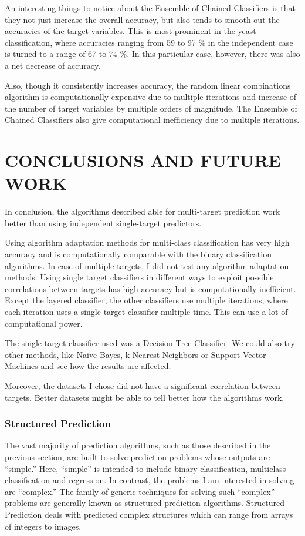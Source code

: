 \documentclass[letterpaper, 11 pt, conference]{IEEEtran}  %
\begin{document}
An interesting things to notice about the Ensemble of Chained Classifiers is that they not just increase the overall accuracy, but also tends to smooth out the accuracies of the target variables. This is most prominent in the yeast classification, where accuracies ranging from 59 to 97 \% in the independent case is turned to a range of 67 to 74 \%. In this particular case, however, there was also a net decrease of accuracy.

Also, though it consistently increases accuracy, the random linear combinations algorithm is computationally expensive due to multiple iterations and increase of the number of target variables by multiple orders of magnitude. The Ensemble of Chained Classifiers also give computational inefficiency due to multiple iterations.

\section{CONCLUSIONS AND FUTURE WORK}

In conclusion, the algorithms described able for multi-target prediction work better than using independent single-target predictors.

Using algorithm adaptation methods for multi-class classification has very high accuracy and is computationally comparable with the binary classification algorithms. In case of multiple targets, I did not test any algorithm adaptation methods. Using single target classifiers in different ways to exploit possible correlations between targets has high accuracy but is computationally inefficient. Except the layered classifier, the other classifiers use multiple iterations, where each iteration uses a single target classifier multiple time. This can use a lot of computational power.

The single target classifier used was a Decision Tree Classifier. We could also try other methods, like Naive Bayes, k-Nearest Neighbors or Support Vector Machines and see how the results are affected.

Moreover, the datasets I chose did not have a significant correlation between targets. Better datasets might be able to tell better how the algorithms work.

\subsubsection*{\textbf{Structured Prediction}}

The vast majority of prediction algorithms, such as those described in the previous section, are built to solve prediction problems whose outputs are “simple.” Here, “simple” is intended to include binary classification, multiclass classification and regression. In contrast, the problems I am
interested in solving are “complex.” The family of generic techniques for solving such “complex” problems are generally known as structured prediction algorithms. Structured Prediction deals with predicted complex structures which can range from arrays of integers to images.
\end{document}
